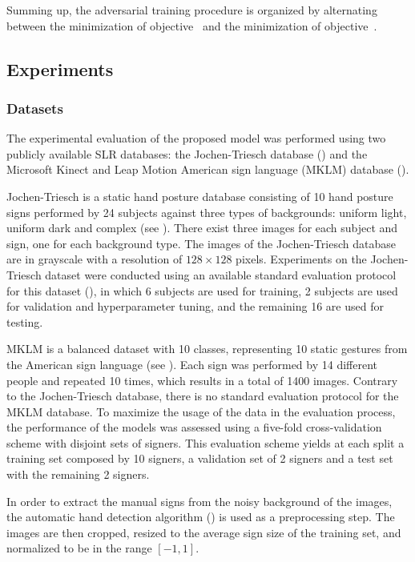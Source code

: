 Summing up, the adversarial training procedure is organized by alternating between the minimization of objective~ and the minimization of objective~.

\subsection{Experiments}
\label{sec:adv_signer_inv_experiments}

\subsubsection{Datasets}
The experimental evaluation of the proposed model was performed using two publicly available SLR databases: the Jochen-Triesch database (\citet{Triesch2001}) and the Microsoft Kinect and Leap Motion American sign language (MKLM) database (\citet{Marin2014, Marin2016}).

Jochen-Triesch is a static hand posture database consisting of 10 hand posture signs performed by 24 subjects against three types of backgrounds: uniform light, uniform dark and complex (see ). There exist three images for each subject and sign, one for each background type. The images of the Jochen-Triesch database are in grayscale with a resolution of $128\times 128$ pixels. Experiments on the Jochen-Triesch dataset were conducted using an available standard evaluation protocol for this dataset (\citet{Just2006}), in which 6 subjects are used for training, 2 subjects are used for validation and hyperparameter tuning, and the remaining 16 are used for testing.

MKLM is a balanced dataset with 10 classes, representing 10 static gestures from the American sign language (see ). Each sign was performed by 14 different people and repeated 10 times, which results in a total of 1400 images. Contrary to the Jochen-Triesch database, there is no standard evaluation protocol for the MKLM database. To maximize the usage of the data in the evaluation process, the performance of the models was assessed using a five-fold cross-validation  scheme with disjoint sets of signers. This evaluation scheme yields at each split a training set composed by 10 signers, a validation set of 2 signers and a test set with the remaining 2 signers.

In order to extract the manual signs from the noisy background of the images, the automatic hand detection algorithm (\citet{Ferreira2018}) is used as a preprocessing step. The images are then cropped, resized to the average sign size of the training set, and normalized to be in the range $[-1,1]$.

